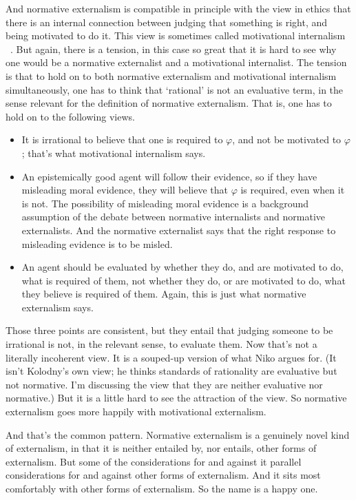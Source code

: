 And normative externalism is compatible in principle with the view in ethics that there is an internal connection between judging that something is right, and being motivated to do it. This view is sometimes called motivational internalism ~\citep{Rosati2014}. But again, there is a tension, in this case so great that it is hard to see why one would be a normative externalist and a motivational internalist. The tension is that to hold on to both normative externalism and motivational internalism simultaneously, one has to think that `rational' is not an evaluative term, in the sense relevant for the definition of normative externalism. That is, one has to hold on to the following views.

\begin{itemize}
\item{} It is irrational to believe that one is required to $\varphi$, and not be motivated to $\varphi$; that's what motivational internalism says.

\item{} An epistemically good agent will follow their evidence, so if they have misleading moral evidence, they will believe that $\varphi$ is required, even when it is not. The possibility of misleading moral evidence is a background assumption of the debate between normative internalists and normative externalists. And the normative externalist says that the right response to misleading evidence is to be misled.

\item{} An agent should be evaluated by whether they do, and are motivated to do, what is required of them, not whether they do, or are motivated to do, what they believe is required of them. Again, this is just what normative externalism says.

\end{itemize}
Those three points are consistent, but they entail that judging someone to be irrational is not, in the relevant sense, to evaluate them. Now that's not a literally incoherent view. It is a souped-up version of what Niko \citet{Kolodny2005} argues for. (It isn't Kolodny's own view; he thinks standards of rationality are evaluative but not normative. I'm discussing the view that they are neither evaluative nor normative.) But it is a little hard to see the attraction of the view. So normative externalism goes more happily with motivational externalism.

And that's the common pattern. Normative externalism is a genuinely novel kind of externalism, in that it is neither entailed by, nor entails, other forms of externalism. But some of the considerations for and against it parallel considerations for and against other forms of externalism. And it sits most comfortably with other forms of externalism. So the name is a happy one.

